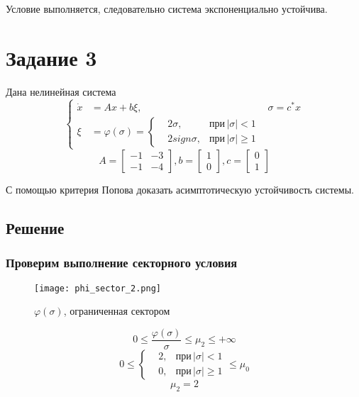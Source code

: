     Условие выполняется, следовательно система экспоненциально устойчива.

    \section*{Задание 3}
    Дана нелинейная система
    \begin{equation*}
        \left\{
        \begin{aligned}
            \dot{x} &= Ax + b\xi,& \sigma = c^*x\\
            \xi &= \varphi(\sigma)=\left\{
            \begin{aligned}
                &2\sigma, &\mbox{при}\,\left| \sigma \right| < 1\\
                &2sign\sigma, &\mbox{при}\,\left| \sigma \right| \geq 1
            \end{aligned}\right.&
        \end{aligned}
        \right.
    \end{equation*}
    \begin{equation*}
        A =
        \begin{bmatrix}
            -1& -3\\
            -1& -4
        \end{bmatrix}
        , b =
        \begin{bmatrix}
            1\\
            0
        \end{bmatrix}
        , c =
        \begin{bmatrix}
            0\\
            1
        \end{bmatrix}
    \end{equation*}

    С помощью критерия Попова доказать асимптотическую устойчивость системы.

    \subsection*{Решение}

    \subsubsection*{Проверим выполнение секторного условия}
    \begin{figure}[H]
        \centering
        \texttt{[image: phi\_sector\_2.png]}
        \caption{$\varphi(\sigma)$, ограниченная сектором}
    \end{figure}
    \[0 \leq \dfrac{\varphi(\sigma)}{\sigma} \leq \mu_2 \leq +\infty\]
    \begin{equation*}
        0 \leq
        \left\{
        \begin{aligned}
            &2, &\mbox{при}\,\left| \sigma \right| < 1\\
            &0, &\mbox{при}\,\left| \sigma \right| \geq 1
        \end{aligned}
        \right.
        \leq \mu_0
    \end{equation*}
    \[\mu_2 = 2\]

